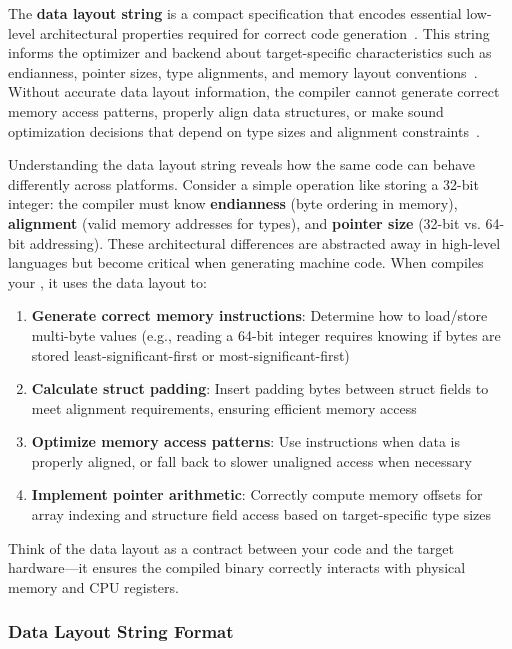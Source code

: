 The \textbf{data layout string} is a compact specification that encodes essential low-level architectural properties required for correct code generation~\cite{llvmlangref}. This string informs the  optimizer and backend about target-specific characteristics such as endianness, pointer sizes, type alignments, and memory layout conventions~\cite{lopesauler2014}. Without accurate data layout information, the compiler cannot generate correct memory access patterns, properly align data structures, or make sound optimization decisions that depend on type sizes and alignment constraints~\cite{llvmessentials}.

Understanding the data layout string reveals how the same  code can behave differently across platforms. Consider a simple operation like storing a 32-bit integer: the compiler must know \textbf{endianness} (byte ordering in memory), \textbf{alignment} (valid memory addresses for types), and \textbf{pointer size} (32-bit vs. 64-bit addressing). These architectural differences are abstracted away in high-level languages but become critical when generating machine code. When  compiles your , it uses the data layout to:

\begin{enumerate}[noitemsep]
  \item \textbf{Generate correct memory instructions}: Determine how to load/store multi-byte values (e.g., reading a 64-bit integer requires knowing if bytes are stored least-significant-first or most-significant-first)
  \item \textbf{Calculate struct padding}: Insert padding bytes between struct fields to meet alignment requirements, ensuring efficient memory access
  \item \textbf{Optimize memory access patterns}: Use  instructions when data is properly aligned, or fall back to slower unaligned access when necessary
  \item \textbf{Implement pointer arithmetic}: Correctly compute memory offsets for array indexing and structure field access based on target-specific type sizes
\end{enumerate}

Think of the data layout as a contract between your  code and the target hardware---it ensures the compiled binary correctly interacts with physical memory and CPU registers.

\subsubsection*{Data Layout String Format}

